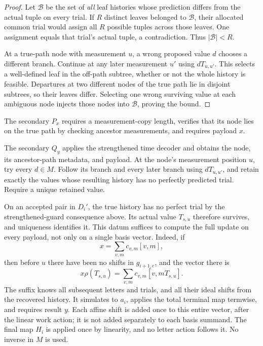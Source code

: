 \begin{proof}
Let \(\mathcal B\) be the set of \emph{all} leaf histories whose prediction
differs from the actual tuple on every trial. If \(R\) distinct leaves
belonged to \(\mathcal B\), their allocated common trial would assign all
\(R\) possible tuples across those leaves. One assignment equals that trial's
actual tuple, a contradiction. Thus \(|\mathcal B|<R\).

At a true-path node with measurement \(u\), a wrong proposed value \(d\)
chooses a different branch. Continue at any later measurement \(u'\) using
\(dT_{u,u'}\). This selects a well-defined leaf in the off-path subtree,
whether or not the whole history is feasible.
Departures at two different nodes of the true path lie in disjoint subtrees,
so their leaves differ. Selecting one wrong surviving value at each ambiguous
node injects those nodes into \(\mathcal B\), proving the bound.
\end{proof}

The secondary \(P_x\) requires a measurement-copy length, verifies that its
node lies on the true path by checking ancestor measurements, and requires
payload \(x\).

The secondary \(Q_y\) applies the strengthened time decoder and obtains the
node, its ancestor-path metadata, and payload. At the node's measurement
position \(u\), try every \(d\in M\). Follow its branch and every later branch
using \(dT_{u,u'}\), and retain exactly the values whose resulting history
has no perfectly predicted trial. Require a unique retained value.

On an accepted pair in \(D_i'\), the true history has no perfect trial by
the strengthened-guard consequence above. Its actual value \(T_{s,u}\)
therefore survives, and uniqueness identifies it.
This datum suffices to compute the full update on every payload, not only on
a single basis vector. Indeed, if
\[
                        x=\sum_{v,m}c_{v,m}[v,m],
\]
then before \(u\) there have been no shifts in \(g_{i+1,e}\), and the vector
there is
\begin{equation}\label{eq:secondary-payload}
                x\rho(T_{s,u})
                   =\sum_{v,m}c_{v,m}[v,mT_{s,u}].
\end{equation}
The suffix knows all subsequent letters and trials, and all their ideal
shifts from the recovered history. It simulates to \(a_i\), applies the
total terminal map termwise, and requires result \(y\).
Each affine shift is added once to this entire vector, after the linear
work action; it is not added separately to each basis summand. The final
map \(H_i\) is applied once by linearity, and no letter action follows it.
No inverse in \(M\) is used.

